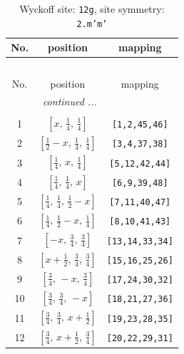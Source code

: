 \documentclass[fleqn,8pt]{jsarticle}
\begin{document}
\begin{longtable}{ccc}
\caption{Wyckoff site: {\tt 12g}, site symmetry: {\tt 2.m'm'}}
 \\
 \hline \hline
No. & position & mapping \\ \hline \endfirsthead

\multicolumn{2}{l}{\tablename\ \thetable{}} \\
 \hline \hline
No. & position & mapping \\ \hline \endhead

 \hline \hline
\multicolumn{2}{r}{\footnotesize\it continued ...} \\ \endfoot

 \hline \hline
\multicolumn{2}{r}{} \\ \endlastfoot

1 & $\left[ x,\, \frac{1}{4},\, \frac{1}{4} \right]$ & {\tt [1,2,45,46]} \\ \hline
2 & $\left[ \frac{1}{2} - x,\, \frac{1}{4},\, \frac{1}{4} \right]$ & {\tt [3,4,37,38]} \\ \hline
3 & $\left[ \frac{1}{4},\, x,\, \frac{1}{4} \right]$ & {\tt [5,12,42,44]} \\ \hline
4 & $\left[ \frac{1}{4},\, \frac{1}{4},\, x \right]$ & {\tt [6,9,39,48]} \\ \hline
5 & $\left[ \frac{1}{4},\, \frac{1}{4},\, \frac{1}{2} - x \right]$ & {\tt [7,11,40,47]} \\ \hline
6 & $\left[ \frac{1}{4},\, \frac{1}{2} - x,\, \frac{1}{4} \right]$ & {\tt [8,10,41,43]} \\ \hline
7 & $\left[ - x,\, \frac{3}{4},\, \frac{3}{4} \right]$ & {\tt [13,14,33,34]} \\ \hline
8 & $\left[ x + \frac{1}{2},\, \frac{3}{4},\, \frac{3}{4} \right]$ & {\tt [15,16,25,26]} \\ \hline
9 & $\left[ \frac{3}{4},\, - x,\, \frac{3}{4} \right]$ & {\tt [17,24,30,32]} \\ \hline
10 & $\left[ \frac{3}{4},\, \frac{3}{4},\, - x \right]$ & {\tt [18,21,27,36]} \\ \hline
11 & $\left[ \frac{3}{4},\, \frac{3}{4},\, x + \frac{1}{2} \right]$ & {\tt [19,23,28,35]} \\ \hline
12 & $\left[ \frac{3}{4},\, x + \frac{1}{2},\, \frac{3}{4} \right]$ & {\tt [20,22,29,31]} \\
\end{longtable}
\renewcommand{\arraystretch}{1.2}
\end{document}
